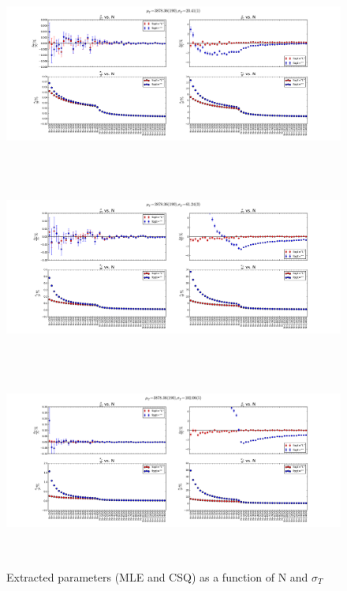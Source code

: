 \documentclass[12pt]{article}
\begin{document}
\begin{figure}[ht]
	\includegraphics[height=2.5in,width=5.5in]{fit-comp_MU-190_SG-1_fit-opt-L_binw-025.pdf}
	\includegraphics[height=2.5in,width=5.5in]{fit-comp_MU-190_SG-3_fit-opt-L_binw-025.pdf}
	\includegraphics[height=2.5in,width=5.5in]{fit-comp_MU-190_SG-5_fit-opt-L_binw-025.pdf}
	\caption{Extracted parameters (MLE and CSQ) as a function of N and $\sigma_{T}$}
	\label{fig2}
\end{figure}

\clearpage
\end{document}

